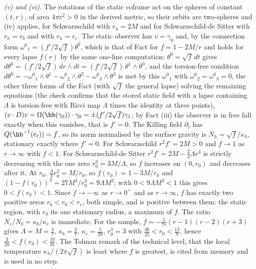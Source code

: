 \emph{(v) and (vi).} The rotations of the static coframe act on the spheres of constant $(t, r)$, of area $4\pi r^{2} > 0$ in the derived metric, so their orbits are two-spheres and (iv) applies, for Schwarzschild with $r_{h} = 2M$ and for Schwarzschild-de Sitter with $r_{h} = r_{b}$ and with $r_{h} = r_{c}$. The static observer has $v = \gamma_{0}$ and, by the connection form $\omega^{0}{}_{1} = (f'/2\sqrt f)\theta^{0}$, which is that of Fact  for $f = 1 - 2M/r$ and holds for every lapse $f(r)$ by the same one-line computation: $\theta^{0} = \sqrt f\,dt$ gives $d\theta^{0} = (f'/2\sqrt f)\,dr \wedge dt = (f'/2\sqrt f)\,\theta^{1} \wedge \theta^{0}$, and the torsion-free condition $d\theta^{0} = -\omega^{0}{}_{1} \wedge \theta^{1} - \omega^{0}{}_{2} \wedge \theta^{2} - \omega^{0}{}_{3} \wedge \theta^{3}$ is met by this $\omega^{0}{}_{1}$ with $\omega^{0}{}_{2} = \omega^{0}{}_{3} = 0$, the other three forms of the Fact (with $\sqrt f$ the general lapse) solving the remaining equations (the check confirms that the stored static field with a lapse containing $\Lambda$ is torsion-free with Ricci map $\Lambda$ times the identity at three points), $(v \cdot D)v = \Omega(\hb(\gamma_{0})) \cdot \gamma_{0} = \pm(f'/2\sqrt f)\gamma_{1}$; by Fact (iii) the observer is in free fall exactly when this vanishes, that is $f' = 0$. The Killing field $\partial_{t}$ has $Q(\hb^{-1}(e_{t})) = f$, so its norm normalised by the surface gravity is $N_{h} = \sqrt f/\kappa_{h}$, stationary exactly where $f' = 0$. For Schwarzschild $r^{2}f' = 2M > 0$ and $f \to 1$ as $r \to \infty$ with $f < 1$. For Schwarzschild-de Sitter $r^{2}f' = 2M - \tfrac23\Lambda r^{3}$ is strictly decreasing with the one zero $r_{0}^{3} = 3M/\Lambda$, so $f$ increases on $(0, r_{0})$ and decreases after it. At $r_{0}$, $\tfrac{\Lambda}{3}r_{0}^{2} = M/r_{0}$, so $f(r_{0}) = 1 - 3M/r_{0}$ and $(1 - f(r_{0}))^{3} = 27M^{3}/r_{0}^{3} = 9\Lambda M^{2}$; with $0 < 9\Lambda M^{2} < 1$ this gives $0 < f(r_{0}) < 1$. Since $f \to -\infty$ as $r \to 0^{+}$ and as $r \to \infty$, $f$ has exactly two positive zeros $r_{b} < r_{0} < r_{c}$, both simple, and is positive between them: the static region, with $r_{0}$ its one stationary radius, a maximum of $f$. The ratio $N_{c}/N_{b} = \kappa_{b}/\kappa_{c}$ is immediate. For the sample, $f = -\tfrac{1}{7r}(r - 1)(r - 2)(r + 3)$ gives $\Lambda = M = \tfrac37$, $\kappa_{b} = \tfrac27$, $\kappa_{c} = \tfrac{5}{28}$, $r_{0}^{3} = 3$ with $\tfrac{36}{25} < r_{0} < \tfrac{13}{9}$, hence $\tfrac{3}{28} < f(r_{0}) < \tfrac{10}{91}$. The Tolman remark of the technical level, that the local temperature $\kappa_{h}/(2\pi\sqrt f)$ is least where $f$ is greatest, is cited from memory and is used in no step.

